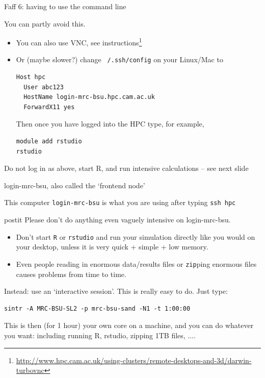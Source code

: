 \documentclass[t,10pt]{beamer}
\let\oldfootnote\footnote
\renewcommand\footnote[1][]{\oldfootnote[frame,#1]}
\newenvironment{highlightblock}[0]%
  {\begin{beamercolorbox}[sep=1em]{postit}}%
  {\end{beamercolorbox}}
\begin{document}
\begin{frame}[fragile]{Faff 6: having to use the command line}

You can \alert{partly} avoid this.

\begin{itemize}
\item
You can also use \alert{VNC}, see instructions\footnote{\url{http://www.hpc.cam.ac.uk/using-clusters/remote-desktops-and-3d/darwin-turbovnc}}

\item Or (maybe slower?) change \texttt{~/.ssh/config} on your Linux/Mac to

\begin{verbatim}
Host hpc
  User abc123
  HostName login-mrc-bsu.hpc.cam.ac.uk
  ForwardX11 yes
\end{verbatim}

Then once you have logged into the HPC type, for example,
\begin{verbatim}
module add rstudio
rstudio
\end{verbatim}
\end{itemize}

\alert{Do not log in as above, start R, and run intensive calculations -- see next slide}

\end{frame}

\begin{frame}[fragile]{login-mrc-bsu, also called the `frontend node'}

This computer \texttt{login-mrc-bsu} is what you are using after typing \texttt{ssh hpc}

\bigskip
\begin{highlightblock}
Please don't do anything even vaguely intensive on login-mrc-bsu.
\end{highlightblock}

\begin{itemize}
\item Don't start \texttt{R} or \texttt{rstudio} and run your simulation directly like you would on your desktop, unless it is very quick + simple + low memory.
\item Even people reading in enormous data/results files or \texttt{zip}ping enormous files causes problems from time to time.
\end{itemize}

\vspace{\baselineskip}
\alert{Instead: use an `interactive session'. This is really easy to do}. Just type:

\begin{verbatim}
sintr -A MRC-BSU-SL2 -p mrc-bsu-sand -N1 -t 1:00:00
\end{verbatim}
This is then (for 1 hour) your own core on a machine, and you can do whatever you want: including running R, rstudio, zipping 1TB files, ....
\end{frame}
\end{document}
